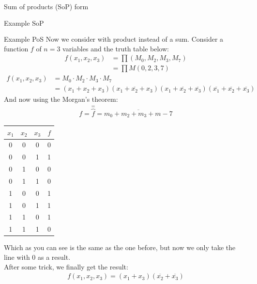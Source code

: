\begin{parag}{Sum of products (SoP) form}
\begin{subparag}{Example SoP}
\begin{itemize}
    \end{itemize}
 \end{subparag}
 \begin{subparag}{Example PoS}
     Now we consider with product instead of a sum. Consider a function $f$ of $n = 3$ variables and the truth table below:
     \begin{align*}
         f(x_1, x_2, x_3) &= \prod(M_0, M_2, M_3, M_7) \\
                          &= \prod M(0, 2, 3, 7)
     \end{align*}
     \begin{align*}
         f(x_1, x_2, x_3) &= M_0 \cdot M_2 \cdot M_3 \cdot M_7 \\
                          &= (x_1 + x_2 + x_3)(x_1 + \overline{x_2} + x_3)(x_1 + \overline{x_2} + \overline{x_3})( \overline{x_1} + \overline{x_2} + \overline{x_3})
     \end{align*}
     And now using the Morgan's theorem:
     \begin{align*}
         f = \overbrace{f}^{=}= \overline{m_0 + m_2 + m_3 + m-7}
     \end{align*}
      \begin{center}
     \begin{tabular}{ccc|c}
         \hline
         $x_1$ & $x_2$ & $x_3$ & $f$ \\
         \hline
         \hline
         0 & 0 & 0 & 0 \\
         \hline
         0 & 0 & 1 & 1\\
         \hline
         0 & 1 & 0 & 0 \\
         \hline
         0 & 1 & 1 & 0 \\
         \hline
         1 & 0 & 0 & 1 \\
         \hline
         1 & 0 & 1 & 1 \\
         \hline
         1 & 1 & 0 & 1 \\
         \hline
         1 & 1 & 1 & 0 \\
         \hline
     \end{tabular}
     \end{center}
     Which as you can see is the same as the one before, but now we only take the line with $0$ as a result.
     \\
     After some trick, we finally get the result:
     \begin{align*}
         f(x_1, x_2, x_3) =(x_1 + x_3)( \overline{x_2} + \overline{x_3})
     \end{align*}

\end{subparag}
\end{parag}
